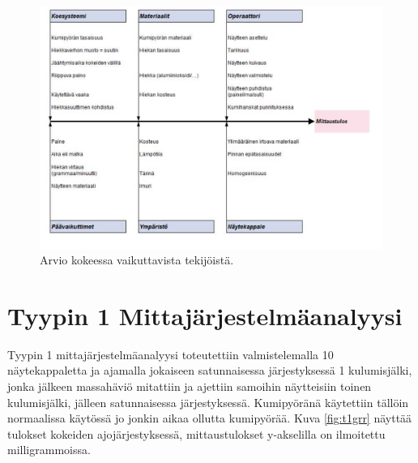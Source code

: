 \documentclass[12pt,a4paper,finnish]{tutthesis}
\begin{document}
\begin{figure}
  \begin{center}
    \includegraphics[width=1.0\textwidth]{Capture7}
  \end{center}
  \caption[Kalanruotokaavio abraasiokokeesta]{Arvio kokeessa vaikuttavista tekijöistä.}
  \label{fig:ruoto1}
\end{figure}

\section{Tyypin 1 Mittajärjestelmäanalyysi}

Tyypin 1 mittajärjestelmäanalyysi toteutettiin valmistelemalla 10 näytekappaletta ja ajamalla jokaiseen satunnaisessa järjestyksessä 1 kulumisjälki, jonka jälkeen massahäviö mitattiin ja ajettiin samoihin näytteisiin toinen kulumisjälki, jälleen satunnaisessa järjestyksessä. Kumipyöränä käytettiin tällöin
normaalissa käytössä jo jonkin aikaa ollutta kumipyörää.
Kuva \ref{fig:t1grr} näyttää tulokset kokeiden ajojärjestyksessä, mittaustulokset y-akselilla on ilmoitettu milligrammoissa.
\end{document}
